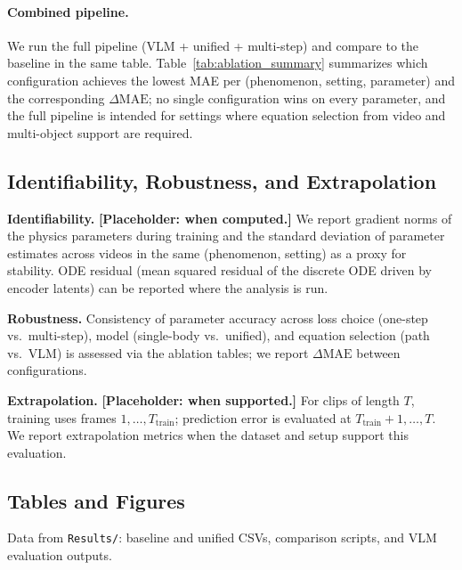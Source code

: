 \paragraph{Combined pipeline.} We run the full pipeline (VLM + unified + multi-step) and compare to the baseline in the same table. Table~\ref{tab:ablation_summary} summarizes which configuration achieves the lowest MAE per (phenomenon, setting, parameter) and the corresponding $\Delta\mathrm{MAE}$; no single configuration wins on every parameter, and the full pipeline is intended for settings where equation selection from video and multi-object support are required.

\subsection{Identifiability, Robustness, and Extrapolation}
\label{sec:exp_identifiability_robustness}

\textbf{Identifiability.} \textbf{[Placeholder: when computed.]} We report gradient norms of the physics parameters during training and the standard deviation of parameter estimates across videos in the same (phenomenon, setting) as a proxy for stability. ODE residual (mean squared residual of the discrete ODE driven by encoder latents) can be reported where the analysis is run.

\textbf{Robustness.} Consistency of parameter accuracy across loss choice (one-step vs.\ multi-step), model (single-body vs.\ unified), and equation selection (path vs.\ VLM) is assessed via the ablation tables; we report $\Delta\mathrm{MAE}$ between configurations.

\textbf{Extrapolation.} \textbf{[Placeholder: when supported.]} For clips of length $T$, training uses frames $1, \ldots, T_{\mathrm{train}}$; prediction error is evaluated at $T_{\mathrm{train}}+1, \ldots, T$. We report extrapolation metrics when the dataset and setup support this evaluation.

\subsection{Tables and Figures}
\label{sec:exp_tables}

Data from \texttt{Results/}: baseline and unified CSVs, comparison scripts, and VLM evaluation outputs.

